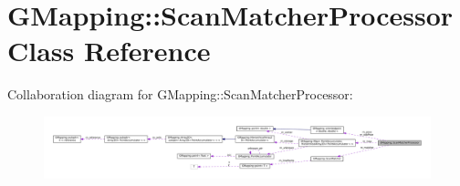 \hypertarget{classGMapping_1_1ScanMatcherProcessor}{}\section{G\+Mapping\+:\+:Scan\+Matcher\+Processor Class Reference}
\label{classGMapping_1_1ScanMatcherProcessor}


Collaboration diagram for G\+Mapping\+:\+:Scan\+Matcher\+Processor\+:
\nopagebreak
\begin{figure}[H]
\begin{center}
\leavevmode
\includegraphics[width=350pt]{classGMapping_1_1ScanMatcherProcessor__coll__graph}
\end{center}
\end{figure}
